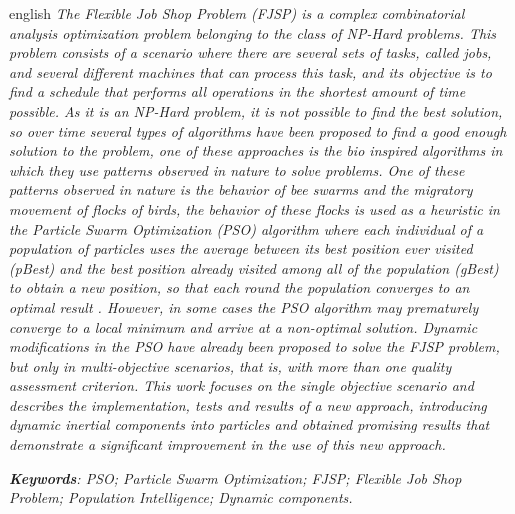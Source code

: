 \par

\begin{resumo}[Abstract]
  \begin{otherlanguage*}{english}
    \emph{
      The \textit{Flexible Job Shop Problem} (FJSP) is a complex combinatorial analysis optimization problem belonging to the class of NP-Hard problems. This problem consists of a scenario where there are several sets of tasks, called \textit{jobs}, and several different machines that can process this task, and its objective is to find a schedule that performs all operations in the shortest amount of time possible. As it is an NP-Hard problem, it is not possible to find the best solution, so over time several types of algorithms have been proposed to find a good enough solution to the problem, one of these approaches is the bio inspired algorithms in which they use patterns observed in nature to solve problems. One of these patterns observed in nature is the behavior of bee swarms and the migratory movement of flocks of birds, the behavior of these flocks is used as a heuristic in the \textit{Particle Swarm Optimization} (PSO) algorithm where each individual of a population of particles uses the average between its best position ever visited (\textit{pBest}) and the best position already visited among all of the population (\textit{gBest}) to obtain a new position, so that each round the population converges to an optimal result . However, in some cases the PSO algorithm may prematurely converge to a local minimum and arrive at a non-optimal solution. Dynamic modifications in the PSO have already been proposed to solve the FJSP problem, but only in multi-objective scenarios, that is, with more than one quality assessment criterion. This work focuses on the single objective scenario and describes the implementation, tests and results of a new approach, introducing dynamic inertial components into particles and obtained promising results that demonstrate a significant improvement in the use of this new approach.
    }
    \vspace{\onelineskip}

    \noindent
    \emph{	
      \textbf{Keywords}: PSO; Particle Swarm Optimization; FJSP; Flexible Job Shop Problem; Population Intelligence; Dynamic components.
    }
  \end{otherlanguage*}
\end{resumo}
